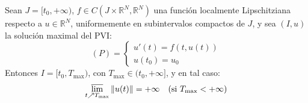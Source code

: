 \begin{teorema}
    Sean $J = [t_0, +\infty)$, $f \in C(J \times \mathbb{R}^N, \mathbb{R}^N)$ una función localmente Lipschitziana respecto a $u \in \mathbb{R}^N$, uniformemente en subintervalos compactos de $J$, y sea $(I, u)$ la solución maximal del PVI:
    \[
        (P) =
        \begin{cases}
            u'(t) = f(t, u(t)) \\
            u(t_0) = u_0
        \end{cases}
    \]
    Entonces $I = [t_0, T_{\text{max}})$, con $T_{\text{max}} \in (t_0, +\infty]$, y en tal caso:
    \[
        \varlimsup_{t \nearrow T_{\text{max}}} \| u(t) \| = +\infty \quad \text{(si } T_{\text{max}} < +\infty \text{)}
    \]    
\end{teorema}

